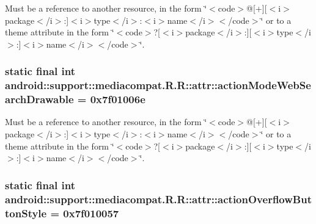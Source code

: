 Must be a reference to another resource, in the form \char`\"{}$<$code$>$@\mbox{[}+\mbox{]}\mbox{[}$<$i$>$package$<$/i$>$:\mbox{]}$<$i$>$type$<$/i$>$:$<$i$>$name$<$/i$>$$<$/code$>$\char`\"{} or to a theme attribute in the form \char`\"{}$<$code$>$?\mbox{[}$<$i$>$package$<$/i$>$:\mbox{]}\mbox{[}$<$i$>$type$<$/i$>$:\mbox{]}$<$i$>$name$<$/i$>$$<$/code$>$\char`\"{}. \hypertarget{classandroid_1_1support_1_1mediacompat_1_1_r_1_1attr_00d3cc2d6f859c840b360380cfe3e31b}{
\subsubsection[{actionModeWebSearchDrawable}]{\setlength{\rightskip}{0pt plus 5cm}static final int android::support::mediacompat.R.R::attr::actionModeWebSearchDrawable = 0x7f01006e}}
\label{classandroid_1_1support_1_1mediacompat_1_1_r_1_1attr_00d3cc2d6f859c840b360380cfe3e31b}


Must be a reference to another resource, in the form \char`\"{}$<$code$>$@\mbox{[}+\mbox{]}\mbox{[}$<$i$>$package$<$/i$>$:\mbox{]}$<$i$>$type$<$/i$>$:$<$i$>$name$<$/i$>$$<$/code$>$\char`\"{} or to a theme attribute in the form \char`\"{}$<$code$>$?\mbox{[}$<$i$>$package$<$/i$>$:\mbox{]}\mbox{[}$<$i$>$type$<$/i$>$:\mbox{]}$<$i$>$name$<$/i$>$$<$/code$>$\char`\"{}. \hypertarget{classandroid_1_1support_1_1mediacompat_1_1_r_1_1attr_0e6f6880d80ed4d606d809ac2b9e81cf}{
\subsubsection[{actionOverflowButtonStyle}]{\setlength{\rightskip}{0pt plus 5cm}static final int android::support::mediacompat.R.R::attr::actionOverflowButtonStyle = 0x7f010057}}
\label{classandroid_1_1support_1_1mediacompat_1_1_r_1_1attr_0e6f6880d80ed4d606d809ac2b9e81cf}


